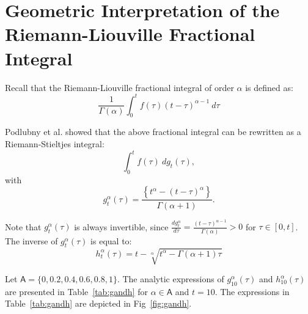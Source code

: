\documentclass{article}
\theoremstyle{theorem}
\theoremstyle{definition}
\begin{document}
\section{Geometric Interpretation of the Riemann-Liouville Fractional Integral}

Recall that the Riemann-Liouville fractional integral of order $\alpha$ is defined as:
\begin{equation}
\label{eq:RL_frac_int}
\frac{1}{\Gamma(\alpha)}\int_{0}^{t}f(\tau)(t-\tau)^{\alpha-1}~d\tau
\end{equation}

\noindent
Podlubny et al. showed that the above fractional integral can be rewritten as a Riemann-Stieltjes integral:
\begin{equation}
\label{eq:rs}
\int_0^{t} f(\tau)~dg_t(\tau),
\end{equation}
with 
\begin{equation}
\label{eq:g_rl}
g_t^{\alpha}(\tau) = \frac{\left \{t^{\alpha} - (t-\tau)^{\alpha} \right \}}{\Gamma(\alpha+1)}. 
\end{equation}

\noindent
Note that $g_t^{\alpha}(\tau)$ is always invertible, since $\frac{d g_t^{\alpha}}{d \tau} = \frac{(t-\tau)^{\alpha-1}}{\Gamma(\alpha)}>0$ for $\tau\in[0,t]$. The inverse 
of $g_t^{\alpha}(\tau)$ is equal to:
\begin{equation}
h_t^{\alpha}(\tau) = t - \sqrt[\alpha]{t^{\alpha} - \Gamma(\alpha+1)\tau}
\end{equation}

\noindent
Let $\mathsf{A} = \{0,0.2,0.4,0.6,0.8,1\}$. The analytic expressions of $g_{10}^{\alpha}(\tau)$ and $h_{10}^{\alpha}(\tau)$ are presented in Table~\ref{tab:gandh} for $\alpha\in\mathsf{A}$ and $t=10$. 
The expressions in Table~\ref{tab:gandh} are depicted in Fig~\ref{fig:gandh}.
\end{document}
